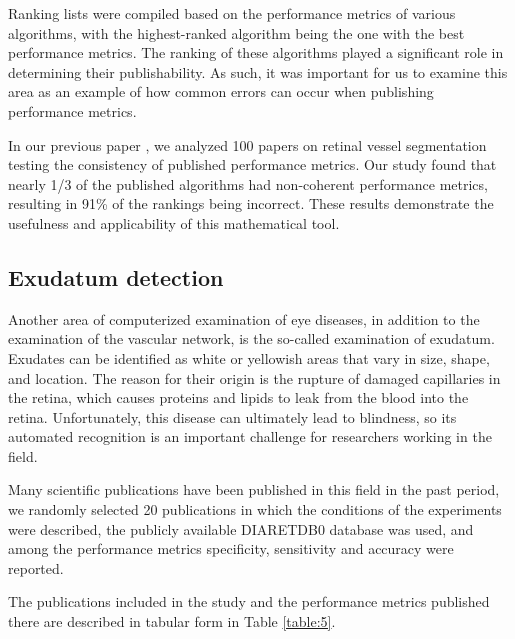 \documentclass[5p, final]{elsarticle}
\begin{document}
Ranking lists were compiled based on the performance metrics of various algorithms, with the highest-ranked algorithm being the one with the best performance metrics. The ranking of these algorithms played a significant role in determining their publishability. As such, it was important for us to examine this area as an example of how common errors can occur when publishing performance metrics.

In our previous paper \cite{vessel}, we analyzed 100 papers on retinal vessel segmentation testing the consistency of published performance metrics. Our study found that nearly 1/3 of the published algorithms had non-coherent performance metrics, resulting in 91\% of the rankings being incorrect. These results demonstrate the usefulness and applicability of this mathematical tool.

\subsection{Exudatum detection}
Another area of computerized examination of eye diseases, in addition to the examination of the vascular network, is the so-called examination of exudatum. Exudates can be identified as white or yellowish areas that vary in size, shape, and location. The reason for their origin is the rupture of damaged capillaries in the retina, which causes proteins and lipids to leak from the blood into the retina. Unfortunately, this disease can ultimately lead to blindness, so its automated recognition is an important challenge for researchers working in the field.

Many scientific publications have been published in this field in the past period, we randomly selected 20 publications in which the conditions of the experiments were described, the publicly available DIARETDB0 database \cite{diaretdb1} was used, and among the performance metrics specificity, sensitivity and accuracy were reported.

The publications included in the study and the performance metrics published there are described in tabular form in Table \ref{table:5}.
\end{document}
